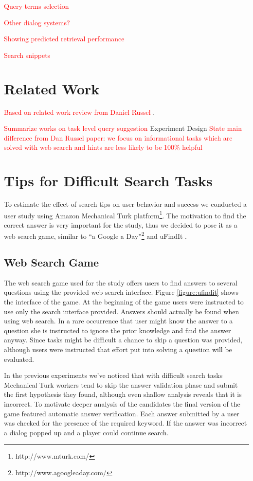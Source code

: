 \documentclass{sig-alternate}
\newcommand\todo[1]{\textcolor{red}{#1}}
\begin{document}
\todo{Query terms selection}

\todo{Other dialog systems?}

\todo{Showing predicted retrieval performance}

\todo{Search snippets}


\section{Related Work}
\todo{Based on related work review from Daniel Russel \cite{Moraveji:2011:MIU:2009916.2009966}}.

\todo{Summarize works on task level query suggestion}
Experiment Design
\todo{State main difference from Dan Russel paper: we focus on informational tasks which are solved with web search and hints are less likely to be 100\% helpful}

\section{Tips for Difficult Search Tasks}
To estimate the effect of search tips on user behavior and success we conducted a user study using Amazon Mechanical Turk platform\footnote{http://www.mturk.com/}. 
The motivation to find the correct answer is very important for the study, thus we decided to pose it as a web search game, similar to ``a Google a Day''\footnote{http://www.agoogleaday.com/} and uFindIt \cite{Ageev:2011:FYG:2009916.2009965}. 

\subsection{Web Search Game}
The web search game used for the study offers users to find answers to several questions using the provided web search interface. Figure \ref{figure:ufindit} shows the interface of the game.
At the beginning of the game users were instructed to use only the search interface provided.
Answers should actually be found when using web search.
In a rare occurrence that user might know the answer to a question she is instructed to ignore the prior knowledge and find the answer anyway.
Since tasks might be difficult a chance to skip a question was provided, although users were instructed that effort put into solving a question will be evaluated.

In the previous experiments we've noticed that with difficult search tasks Mechanical Turk workers tend to skip the answer validation phase and submit the first hypothesis they found, although even shallow analysis reveals that it is incorrect.
To motivate deeper analysis of the candidates the final version of the game featured automatic answer verification. Each answer submitted by a user was checked for the presence of the required keyword.
If the answer was incorrect a dialog popped up and a player could continue search.
\end{document}

